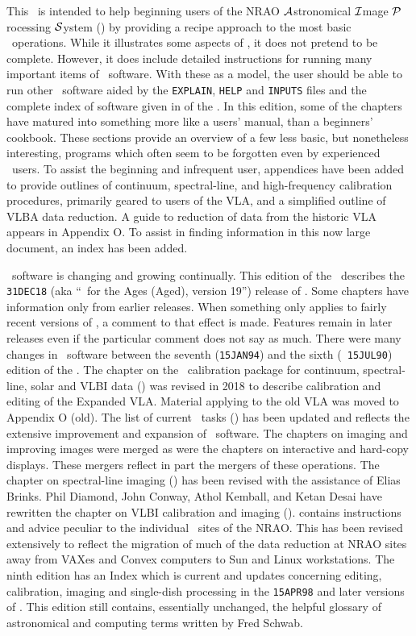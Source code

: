      This \COOKBOOK\ is intended to help beginning
users of the NRAO {$\cal A$}stronomical {$\cal I\/$}mage {$\cal
P\/$}rocessing {$\cal S\/$}ystem (\AIPS) by providing a recipe
approach to the most basic \AIPS\ operations.  While it illustrates
some aspects of \AIPS, it does not pretend to be complete.  However,
it does include detailed instructions for running many important items
of \AIPS\ software.  With these as a model, the user should be able to
run other \AIPS\ software aided by the {\tt EXPLAIN}, {\tt HELP} and
{\tt INPUTS} files and the complete index of software given in
 of the \COOKBOOK\@.  In this edition, some of the
chapters have matured into something more like a users' manual, than a
beginners' cookbook.  These sections provide an overview of a few less
basic, but nonetheless interesting, programs which often seem to be
forgotten even by experienced \AIPS\ users.  To assist the beginning
and infrequent user, appendices have been added to provide outlines of
continuum, spectral-line, and high-frequency calibration procedures,
primarily geared to users of the VLA, and a simplified outline of VLBA
data reduction.   A guide to reduction of data from the historic VLA
appears in Appendix O\@.  To assist in finding information in this now
large document, an index has been added.

     \AIPS\ software is changing and growing continually.  This
edition of the \COOKBOOK\ describes the {\tt 31DEC18} (aka ``\AIPS\
for the Ages (Aged), version 19'') release of \AIPS.  Some chapters
have information only from earlier releases.  When something only
applies to fairly recent versions of \AIPS, a comment to that effect
is made.  Features remain in later releases even if the particular
comment does not say as much.  There were many changes in \AIPS\
software between the seventh ({\tt 15JAN94}) and the sixth ({\tt
15JUL90}) edition of the \COOKBOOK\@.  The chapter on the \AIPS\
calibration package for continuum, spectral-line, solar and VLBI data
(\Rchap{cal}) was revised in 2018 to describe calibration and editing
of the Expanded VLA\@.  Material applying to the old VLA was moved to
Appendix O (old).  The list of current \AIPS\ tasks (\Rchap{list}) has
been updated and reflects the extensive improvement and expansion of
\AIPS\ software.  The chapters on imaging and improving images were
merged as were the chapters on interactive and hard-copy displays.
These mergers reflect in part the mergers of these operations.  The
chapter on spectral-line imaging (\Rchap{line}) has been revised with
the assistance of Elias Brinks.  Phil Diamond, John Conway, Athol
Kemball, and Ketan Desai have rewritten the chapter on VLBI
calibration and imaging (\Rchap{vlbi}).  \Rappen{sys} contains
instructions and advice peculiar to the individual \AIPS\ sites of the
NRAO\@.  This has been revised extensively to reflect the migration of
much of the data reduction at NRAO sites away from VAXes and Convex
computers to Sun and Linux workstations.  The ninth edition has an
Index which is current and updates concerning editing, calibration,
imaging and single-dish processing in the {\tt 15APR98} and later
versions of \AIPS\@.  This edition still contains, essentially
unchanged, the helpful glossary of astronomical and computing terms
written by Fred Schwab.

